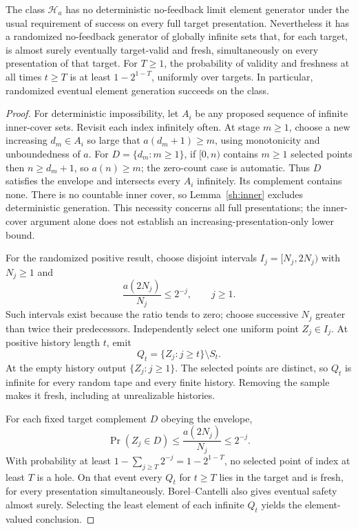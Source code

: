 \begin{theorem}\label{sh:envelope-separation}
The class $\mathcal H_a$ has no deterministic no-feedback limit element generator under the usual requirement of success on every full target presentation. Nevertheless it has a randomized no-feedback generator of globally infinite sets that, for each target, is almost surely eventually target-valid and fresh, simultaneously on every presentation of that target. For $T\ge1$, the probability of validity and freshness at all times $t\ge T$ is at least $1-2^{1-T}$, uniformly over targets. In particular, randomized eventual element generation succeeds on the class.
\end{theorem}
\begin{proof}
For deterministic impossibility, let $A_i$ be any proposed sequence of infinite inner-cover sets. Revisit each index infinitely often. At stage $m\ge1$, choose a new increasing $d_m\in A_i$ so large that $a(d_m+1)\ge m$, using monotonicity and unboundedness of $a$. For $D=\{d_m:m\ge1\}$, if $[0,n)$ contains $m\ge1$ selected points then $n\ge d_m+1$, so $a(n)\ge m$; the zero-count case is automatic. Thus $D$ satisfies the envelope and intersects every $A_i$ infinitely. Its complement contains none. There is no countable inner cover, so Lemma~\ref{sh:inner} excludes deterministic generation. This necessity concerns all full presentations; the inner-cover argument alone does not establish an increasing-presentation-only lower bound.

For the randomized positive result, choose disjoint intervals $I_j=[N_j,2N_j)$ with $N_j\ge1$ and
\[
\frac{a(2N_j)}{N_j}\le2^{-j},\qquad j\ge1.
\]
Such intervals exist because the ratio tends to zero; choose successive $N_j$ greater than twice their predecessors. Independently select one uniform point $Z_j\in I_j$. At positive history length $t$, emit
\[
Q_t=\{Z_j:j\ge t\}\setminus S_t.
\]
At the empty history output $\{Z_j:j\ge1\}$. The selected points are distinct, so $Q_t$ is infinite for every random tape and every finite history. Removing the sample makes it fresh, including at unrealizable histories.

For each fixed target complement $D$ obeying the envelope,
\[
\Pr(Z_j\in D)\le\frac{a(2N_j)}{N_j}\le2^{-j}.
\]
With probability at least $1-\sum_{j\ge T}2^{-j}=1-2^{1-T}$, no selected point of index at least $T$ is a hole. On that event every $Q_t$ for $t\ge T$ lies in the target and is fresh, for every presentation simultaneously. Borel--Cantelli also gives eventual safety almost surely. Selecting the least element of each infinite $Q_t$ yields the element-valued conclusion.
\end{proof}

